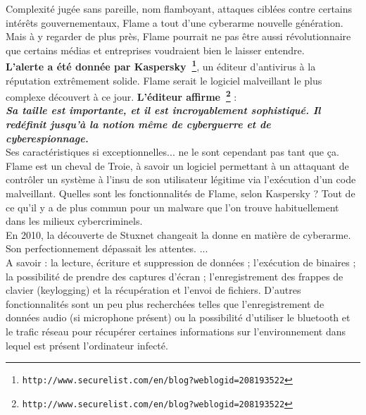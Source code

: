 \documentclass[11pt,twoside,a4paper]{article}
\begin{document}
Complexit{\'e} jug{\'e}e sans pareille, nom flamboyant, attaques cibl{\'e}es contre certains int{\'e}r{\^e}ts gouvernementaux, Flame a tout d'une cyberarme nouvelle g{\'e}n{\'e}ration. Mais {\`a} y regarder de plus pr{\`e}s, Flame pourrait ne pas {\^e}tre aussi r{\'e}volutionnaire que certains m{\'e}dias et entreprises voudraient bien le laisser entendre.~\\

\textbf{L'alerte a {\'e}t{\'e} donn{\'e}e par Kaspersky~\footnote{\texttt{http://www.securelist.com/en/blog?weblogid=208193522}}}, un {\'e}diteur d'antivirus {\`a} la r{\'e}putation extr{\^e}mement solide. Flame serait le logiciel malveillant le plus complexe d{\'e}couvert {\`a} ce jour. \textbf{L'{\'e}diteur affirme~\footnote{\texttt{http://www.securelist.com/en/blog?weblogid=208193522}}} :~\\

	\textbf{\emph{Sa taille est importante, et il est incroyablement sophistiqu{\'e}. Il red{\'e}finit jusqu'{\`a} la notion m{\^e}me de cyberguerre et de cyberespionnage.}}~\\

Ses caract{\'e}ristiques si exceptionnelles... ne le sont cependant pas tant que \c{c}a. Flame est un cheval de Troie, {\`a} savoir un logiciel permettant {\`a} un attaquant de contr{\^o}ler un syst{\`e}me {\`a} l'insu de son utilisateur l{\'e}gitime via l'ex{\'e}cution d'un code malveillant. Quelles sont les fonctionnalit{\'e}s de Flame, selon Kaspersky ? Tout de ce qu'il y a de plus commun pour un malware que l'on trouve habituellement dans les milieux cybercriminels.~\\

En 2010, la d{\'e}couverte de Stuxnet changeait la donne en mati{\`e}re de cyberarme. Son perfectionnement d{\'e}passait les attentes. ...~\\

A savoir : la lecture, {\'e}criture et suppression de donn{\'e}es ; l'ex{\'e}cution de binaires ; la possibilit{\'e} de prendre des captures d'{\'e}cran ; l'enregistrement des frappes de clavier (keylogging) et la r{\'e}cup{\'e}ration et l'envoi de fichiers. D'autres fonctionnalit{\'e}s sont un peu plus recherch{\'e}es telles que l'enregistrement de donn{\'e}es audio (si microphone pr{\'e}sent) ou la possibilit{\'e} d'utiliser le bluetooth et le trafic r{\'e}seau pour r{\'e}cup{\'e}rer certaines informations sur l'environnement dans lequel est pr{\'e}sent l'ordinateur infect{\'e}.~\\
\end{document}
